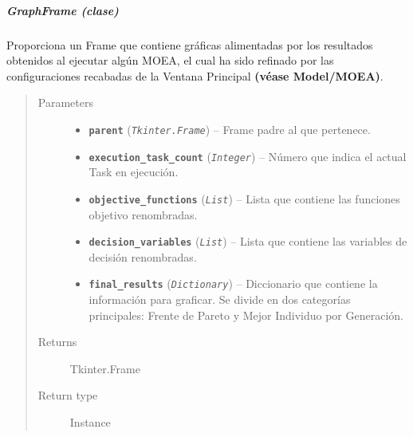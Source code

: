 \documentclass[class=report, crop=false]{standalone}
\begin{document}
\subparagraph{GraphFrame (clase)}
\label{sec:a_3_3_3_1_1}
\begin{fulllineitems}

\begin{DUlineblock}{0em}
\item[] Proporciona un Frame que contiene gráficas 
alimentadas por los resultados obtenidos al ejecutar 
algún MOEA, el cual ha sido refinado por las configuraciones
recabadas de la Ventana Principal \textbf{(véase Model/MOEA)}.
\end{DUlineblock}

\begin{quote}\begin{description}
\item[{Parameters}] \leavevmode\begin{itemize}
\item \textbf{\texttt{parent}} (\emph{\texttt{Tkinter.Frame}}) -- Frame padre al que pertenece.
\item \textbf{\texttt{execution\_task\_count}} (\emph{\texttt{Integer}}) -- Número que indica el actual Task en ejecución.
\item \textbf{\texttt{objective\_functions}} (\emph{\texttt{List}}) -- Lista que contiene las funciones objetivo renombradas.
\item \textbf{\texttt{decision\_variables}} (\emph{\texttt{List}}) -- Lista que contiene las variables de decisión renombradas.
\item \textbf{\texttt{final\_results}} (\emph{\texttt{Dictionary}}) -- Diccionario que contiene la información para graficar. Se divide en dos categorías principales: Frente de Pareto y Mejor Individuo por Generación.
\end{itemize}

\item[{Returns}] \leavevmode
Tkinter.Frame
\item[{Return type}] \leavevmode
Instance
\end{description}\end{quote}


\begin{fulllineitems}

~


\end{fulllineitems}
\end{fulllineitems}
\end{document}
